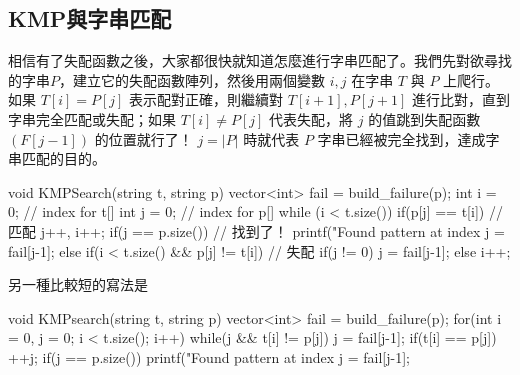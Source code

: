 \subsection{KMP與字串匹配}

相信有了失配函數之後，大家都很快就知道怎麼進行字串匹配了。我們先對欲尋找的字串$P$，建立它的失配函數陣列，然後用兩個變數 $i, j$ 在字串 $T$ 與 $P$ 上爬行。\\

如果 $T[i] = P[j]$ 表示配對正確，則繼續對 $T[i+1], P[j+1]$ 進行比對，直到字串完全匹配或失配；如果 $T[i] \neq P[j]$ 代表失配，將 $j$ 的值跳到失配函數 $(F[j-1])$ 的位置就行了！ $j = |P|$ 時就代表 $P$ 字串已經被完全找到，達成字串匹配的目的。

\begin{C++}
void KMPSearch(string t, string p){
    vector<int> fail = build_failure(p);
    int i = 0; // index for t[]
    int j = 0; // index for p[]
    while (i < t.size()){
        if(p[j] == t[i]){ // 匹配
            j++, i++;
        }
        if(j == p.size()){ // 找到了！
            printf("Found pattern at index %
            j = fail[j-1];
        }
        else if(i < t.size() && p[j] != t[i]){ // 失配
            if(j != 0) j = fail[j-1];
            else i++;
        }
    }
}
\end{C++}
另一種比較短的寫法是
\begin{C++}
void KMPsearch(string t, string p) {
	vector<int> fail = build_failure(p);
	for(int i = 0, j = 0; i < t.size(); i++) {
		while(j && t[i] != p[j]) j = fail[j-1];
		if(t[i] == p[j]) ++j;
		if(j == p.size()) {
			printf("Found pattern at index %
			j = fail[j-1];
		}
	}
}
\end{C++}

